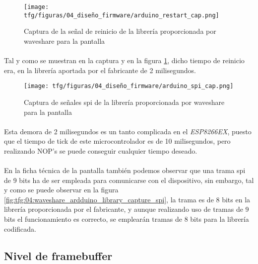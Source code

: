 \begin{figure}[!htb]
    \centering
    \texttt{[image: tfg/figuras/04\_diseño\_firmware/arduino\_restart\_cap.png]}
    \caption{Captura de la señal de reinicio de la librería proporcionada por waveshare para la pantalla}
    \label{fig:tfg:04:waveshare_arduino_library_capture_restart}
\end{figure}

\paragraph{} Tal y como se muestran en la captura y en la figura \ref{fig:tfg:04:waveshare_arduino_library_capture_restart}, dicho tiempo de reinicio era, en la librería aportada por el fabricante de 2 milisegundos.

\begin{figure}[!htb]
    \centering
    \texttt{[image: tfg/figuras/04\_diseño\_firmware/arduino\_spi\_cap.png]}
    \caption{Captura de señales spi de la librería proporcionada por waveshare para la pantalla}
    \label{fig:tfg:04:waveshare_arduino_library_capture_spi}
\end{figure}

\paragraph{} Esta demora de 2 milisegundos es un tanto complicada en el \textit{ESP8266EX}, puesto que el tiempo de tick de este microcontrolador es de 10 milisegundos, pero realizando NOP's \cite[página 52]{xtensa-isa} se puede conseguir cualquier tiempo deseado.

\paragraph{} En la ficha técnica de la pantalla también podemos observar que una trama spi de 9 bits ha de ser empleada para comunicarse con el dispositivo, sin embargo, tal y como se puede observar en la figura \ref{fig:tfg:04:waveshare_ardduino_library_capture_spi}, la trama es de 8 bits en la librería proporcionada por el fabricante, y aunque realizando uso de tramas de 9 bits el funcionamiento es correcto, se emplearán tramas de 8 bits para la librería codificada.

\subsection{Nivel de framebuffer}

